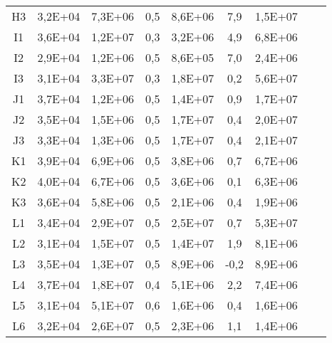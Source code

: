 \begin{center}
\begin{longtable}{ccccccccc}
H3    & 3,2E+04 & 7,3E+06 & 0,5   & 8,6E+06 & 7,9   & 1,5E+07 \\
I1    & 3,6E+04 & 1,2E+07 & 0,3   & 3,2E+06 & 4,9   & 6,8E+06 \\
I2    & 2,9E+04 & 1,2E+06 & 0,5   & 8,6E+05 & 7,0   & 2,4E+06 \\
I3    & 3,1E+04 & 3,3E+07 & 0,3   & 1,8E+07 & 0,2   & 5,6E+07 \\
J1    & 3,7E+04 & 1,2E+06 & 0,5   & 1,4E+07 & 0,9   & 1,7E+07 \\
J2    & 3,5E+04 & 1,5E+06 & 0,5   & 1,7E+07 & 0,4   & 2,0E+07 \\
J3    & 3,3E+04 & 1,3E+06 & 0,5   & 1,7E+07 & 0,4   & 2,1E+07 \\
K1    & 3,9E+04 & 6,9E+06 & 0,5   & 3,8E+06 & 0,7   & 6,7E+06 \\
K2    & 4,0E+04 & 6,7E+06 & 0,5   & 3,6E+06 & 0,1   & 6,3E+06 \\
K3    & 3,6E+04 & 5,8E+06 & 0,5   & 2,1E+06 & 0,4   & 1,9E+06 \\
L1    & 3,4E+04 & 2,9E+07 & 0,5   & 2,5E+07 & 0,7   & 5,3E+07 \\
L2    & 3,1E+04 & 1,5E+07 & 0,5   & 1,4E+07 & 1,9   & 8,1E+06 \\
L3    & 3,5E+04 & 1,3E+07 & 0,5   & 8,9E+06 & -0,2  & 8,9E+06 \\
L4    & 3,7E+04 & 1,8E+07 & 0,4   & 5,1E+06 & 2,2   & 7,4E+06 \\
L5    & 3,1E+04 & 5,1E+07 & 0,6   & 1,6E+06 & 0,4   & 1,6E+06 \\
L6    & 3,2E+04 & 2,6E+07 & 0,5   & 2,3E+06 & 1,1   & 1,4E+06 \\

\end{longtable}
\end{center}

